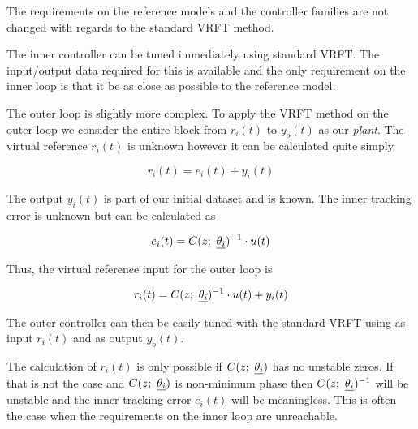 The requirements on the reference models and the controller families are not changed with regards to the standard VRFT method.

The inner controller can be tuned immediately using standard VRFT. The input/output data required for this is available and the only requirement on the inner loop is that it be as close as possible to the reference model. 

The outer loop is slightly more complex. To apply the VRFT method on the outer loop we consider the entire block from \( r_i(t) \) to \( y_o(t) \) as our \emph{plant}. The virtual reference \( r_i(t) \) is unknown however it can be calculated quite simply

\begin{equation}
    r_i(t) = e_i(t) + y_i(t)
\end{equation}

The output \( y_i(t) \) is part of our initial dataset and is known. The inner tracking error is unknown but can be calculated as 

\begin{equation}
     e_i(t) = C(z;\ \underline{\theta_i})^{-1} \cdot u(t)
 \end{equation} 

 Thus, the virtual reference input for the outer loop is

 \begin{equation}
     r_i(t) = C(z;\ \underline{\theta_i})^{-1} \cdot u(t) + y_i(t)
 \end{equation}

 The outer controller can then be easily tuned with the standard VRFT using as input \( r_i(t) \) and as output \( y_o(t) \). 

 The calculation of \( r_i(t) \) is only possible if \( C(z;\ \underline{\theta_i}) \) has no unstable zeros. If that is not the case and \( C(z;\ \underline{\theta_i}) \) is non-minimum phase then \( C(z;\ \underline{\theta_i})^{-1} \) will be unstable and the inner tracking error \( e_i(t) \) will be meaningless. This is often the case when the requirements on the inner loop are unreachable. 


